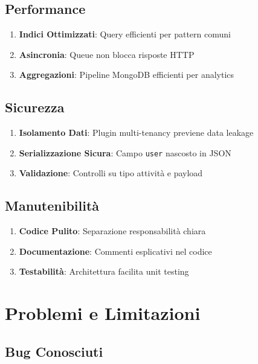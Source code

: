 \documentclass[11pt,a4paper]{article}
\begin{document}
\subsection{Performance}

\begin{enumerate}
    \item \textbf{Indici Ottimizzati}: Query efficienti per pattern comuni
    \item \textbf{Asincronia}: Queue non blocca risposte HTTP
    \item \textbf{Aggregazioni}: Pipeline MongoDB efficienti per analytics
\end{enumerate}

\subsection{Sicurezza}

\begin{enumerate}
    \item \textbf{Isolamento Dati}: Plugin multi-tenancy previene data leakage
    \item \textbf{Serializzazione Sicura}: Campo \texttt{user} nascosto in JSON
    \item \textbf{Validazione}: Controlli su tipo attività e payload
\end{enumerate}

\subsection{Manutenibilità}

\begin{enumerate}
    \item \textbf{Codice Pulito}: Separazione responsabilità chiara
    \item \textbf{Documentazione}: Commenti esplicativi nel codice
    \item \textbf{Testabilità}: Architettura facilita unit testing
\end{enumerate}

\section{Problemi e Limitazioni}

\subsection{Bug Conosciuti}
\end{document}
